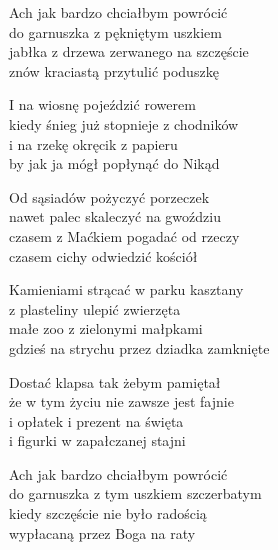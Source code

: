 \begin{text}
    Ach jak bardzo chciałbym powrócić\\
    do garnuszka z pękniętym uszkiem\\
    jabłka z drzewa zerwanego na szczęście\\
    znów kraciastą przytulić poduszkę

    I na wiosnę pojeździć rowerem\\
    kiedy śnieg już stopnieje z chodników\\
    i na rzekę okręcik z papieru\\
    by jak ja mógł popłynąć do Nikąd

    Od sąsiadów pożyczyć porzeczek\\
    nawet palec skaleczyć na gwoździu\\
    czasem z Maćkiem pogadać od rzeczy\\
    czasem cichy odwiedzić kościół

    Kamieniami strącać w parku kasztany\\
    z plasteliny ulepić zwierzęta\\
    małe zoo z zielonymi małpkami\\
    gdzieś na strychu przez dziadka zamknięte

    Dostać klapsa tak żebym pamiętał\\
    że w tym życiu nie zawsze jest fajnie\\
    i opłatek i prezent na święta\\
    i figurki w zapałczanej stajni

    Ach jak bardzo chciałbym powrócić\\
    do garnuszka z tym uszkiem szczerbatym\\
    kiedy szczęście nie było radością\\
    wypłacaną przez Boga na raty
\end{text}
\begin{chord}

\end{chord}